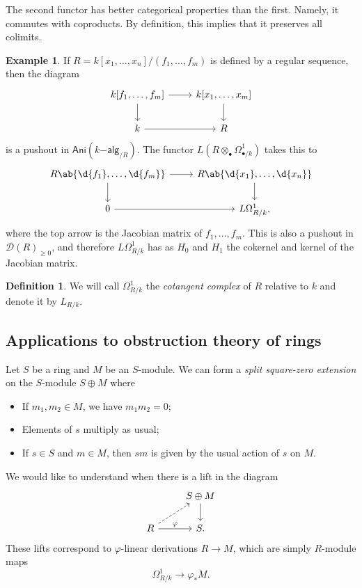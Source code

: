 \documentclass[10pt, oneside]{memoir}
\theoremstyle{definition}
\newtheorem{defn}[thm]{Definition}
\newtheorem{exm}[thm]{Example}
\theoremstyle{remark}
\theoremstyle{plain}
\theoremstyle{definition}
\theoremstyle{remark}
\newcommand{\mc}[1]{\mathcal{#1}}
\newcommand{\ms}[1]{\mathsf{#1}}
\newcommand{\1}{\mathbf{1}}
\newcommand{\2}{\mathbf{2}}
\newcommand{\3}{\mathbf{3}}
\begin{document}
The second functor has better categorical properties than the first. Namely, it commutes with coproducts. By definition, this implies that it preserves all colimits.

\begin{exm}
    If \(R = k[x_1, \ldots, x_n] / (f_1, \ldots, f_m) \) is defined by a regular sequence, then the diagram
    \begin{equation*}
    \begin{tikzcd}
        k[f_1, \ldots, f_m] \ar{r} \ar{d} & k[x_1, \ldots, x_m] \ar{d} \\
        k \ar{r} & R
    \end{tikzcd}
    \end{equation*}
    is a pushout in \(\ms{Ani}(k\ms{-alg}_{/R}) \). The functor \(L(R \otimes_{\bullet} \Omega^1_{\bullet/k}) \) takes this to
    \begin{equation*}
    \begin{tikzcd}
        R\ab\{\d{f_1}, \ldots, \d{f_m} \}  \ar{r} \ar{d} & R \ab\{ \d{x_1}, \ldots, \d{x_n}\} \ar{d} \\
         0 \ar{r} & L \Omega^1_{R/k},
    \end{tikzcd}
    \end{equation*}
    where the top arrow is the Jacobian matrix of \(f_1, \ldots, f_m \). This is also a pushout in \(\mc{D}(R)_{\geq 0} \), and therefore \(L\Omega^1_{R/k} \) has as \(H_0 \) and \(H_1 \) the cokernel and kernel of the Jacobian matrix.
\end{exm}

\begin{defn}
    We will call \(\Omega^1_{R/k} \) the \textit{cotangent complex} of \(R \) relative to \(k \) and denote it by \(L_{R/k} \).
\end{defn}

\subsection{Applications to obstruction theory of rings}%
\label{sub:Applications to obstruction theory of rings}

Let \(S \) be a ring and \(M \) be an \(S \)-module. We can form a \textit{split square-zero extension} on the \(S \)-module \(S \oplus M \) where
\begin{itemize}
    \item If \(m_1, m_2 \in M \), we have \(m_1 m_2 = 0 \);
    \item Elements of \(s \) multiply as usual;
    \item If \(s \in S \) and \(m \in M \), then \(sm \) is given by the usual action of \(s \) on \(M \).
\end{itemize}
We would like to understand when there is a lift in the diagram
\begin{equation*}
\begin{tikzcd}
    & S \oplus M \ar{d} \\
    R \ar{r}{\varphi} \ar[dashrightarrow]{ur} & S.
\end{tikzcd}
\end{equation*}
These lifts correspond to \(\varphi \)-linear derivations \(R \to M \), which are simply \(R \)-module maps
\[ \Omega^1_{R/k} \to \varphi_* M. \]
\end{document}

